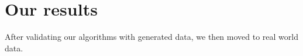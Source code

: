 \section{Our results}
	After validating our algorithms with generated data, we then moved to real world data.